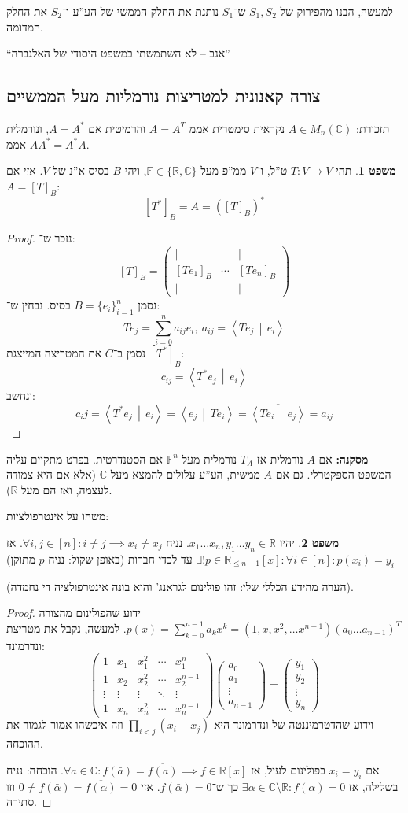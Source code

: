 \documentclass[a4paper]{article}
\newcommand\R     {\mathbb{R}}
\newcommand\C     {\mathbb{C}}
\newcommand\ra    {\rangle}
\newcommand\la    {\langle}
\newcommand\ol    {\overline}
\newcommand\sumni     {\sum_{i = 0}^{n}}
\newcommand\F         {\mathbb{F}}
\newcommand\co        {\colon}
\newcommand\pms[1]    {\begin{pmatrix}
		#1
\end{pmatrix}}
\newcommand\mut [2]   {\left \la #1 \,\middle\vert\, #2 \right \ra}
\newcommand\ag        {\alpha}
\theoremstyle{definition}
\newtheorem{Theorem}{משפט}
\newcommand\theo  [1] {\begin{Theorem}#1\end{Theorem}}
\begin{document}
	למעשה, הבנו מהפירוק של $S_1, S_2$ ש־$S_1$ נותנת את החלק הממשי של הע''ע ו־$S_2$ את החלק המדומה. 
	
	``אגב – לא השתמשתי במשפט היסודי של האלגברה''
	
	\subsection{צורה קאנונית למטריצות נורמליות מעל הממשיים}
	תזכורת: $A \in M_n(\C)$ נקראית סימטרית אממ $A = A^T$ והרמיטית אם $A = A^*$, ונורמלית אממ $AA^* = A^*A$. 
	
	\theo{תהי $T \co V \to V$ ט''ל, ו־$V$ ממ''פ מעל $\F \in \{\R, \C\}$, ויהי $B$ בסיס א''נ של $V$. אזי אם $A = [T]_B$: 
		\[ [T^*]_B = A = ([T]_B)^* \]}  
	\begin{proof}
		נזכר ש־: 
		\[ [T]_B = \pms{\vert &  & \vert \\ [Te_1]_B & \cdots & [Te_n]_B \\ \vert &  & \vert} \]
		נסמן $B = \{e_i\}_{i = 1}^{n}$ בסיס. נבחין ש־: 
		\[ Te_j = \sumni a_{ij}e_i, \ a_{ij} = \mut{Te_j}{e_i} \]
		נסמן ב־$C$ את המטריצה המייצגת $[T^*]_B$: 
		\[ c_{ij} = \mut{T^*e_j}{e_i} \]
		ונחשב: 
		\[ c_ij = \mut{T^*e_j}{e_i} = \mut{e_j}{Te_i} = \ol{\mut{Te_i}{e_j}} = a_{ij} \]
		
	\end{proof}
	
	\textbf{מסקנה: }אם $A$ נורמלית אז $T_A$ נורמלית מעל $\F^n$ אם הסטנדרטית. בפרט מתקיים עליה המשפט הספקטרלי. גם אם $A$ ממשית, הע''ע עלולים להמצא מעל $\C$ (אלא אם היא צמודה לעצמה, ואז הם מעל $\R$). 
	
	משהו על אינטרפולציות: 
	\theo{יהיו $x_1 \dots x_n, y_1 \dots y_n \in \R$. נניח $\forall i, j \in [n] \co i \neq j \implies x_i \neq x_j$. אז $\exists! p \in \R_{\le n - 1}[x] \co \forall i \in [n] \co p(x_i) = y_i$ עד לכדי חברות (באופן שקול: נניח $p$ מתוקן) }
	(הערה מהידע הכללי שלי: זהו פולינום לגראנג' והוא בונה אינטרפולציה די נחמדה). \begin{proof}
		ידוע שהפולינום מהצורה $p(x)  = \sum_{k = 0}^{n - 1} a_k x^k  = (1, x, x^2, \dots x^{n - 1}) (a_0 \dots a_{n - 1})^T$. למעשה, נקבל את מטריצת ונדרמונד: 
		\[ \pms{1 & x_1 & x_1^2 & \cdots & x_1^n \\ 1 & x_2 & x_2^2 & \cdots & x_2^{n - 1} \\ \vdots & \vdots & \vdots & \ddots & \vdots \\ 1 & x_n & x_n^2 & \cdots & x_n^{n - 1}}\pms{a_0 \\ a_1 \\ \vdots \\ a_{n - 1}} = \pms{y_1 \\ y_2 \\ \vdots \\ y_n} \]
		וידוע שהדטרמיננטה של ונדרמונד היא $\prod_{i < j} (x_i - x_j)$ וזה איכשהו אמור לגמור את ההוכחה. 
		
		אם $x_i = y_i$ בפולינום לעיל, אז $\forall a \in \C \co f(\bar a) = \ol{f(a)} \implies f \in \R[x]$. הוכחה: נניח בשלילה, אז $\exists \ag \in \C\setminus \R \co f(\ag) = 0$ כך ש־$f(\bar \ag) = 0$. אזי $0 \neq f(\bar \ag) = \ol{f(\ag)}  = 0$ וזו סתירה. 
	\end{proof}
	
\end{document}
